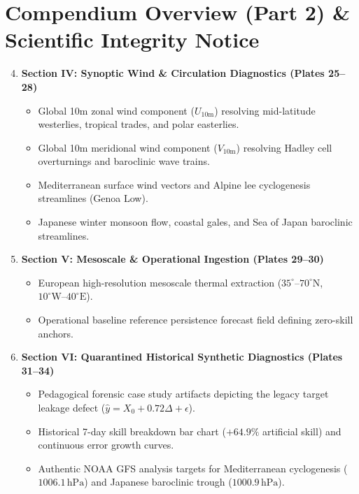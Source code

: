 \documentclass[11pt,a4paper]{article}
\begin{document}
\section*{\Large\color{navyblue} Compendium Overview (Part 2) \& Scientific Integrity Notice}
\vspace{0.15cm}
\begin{tcolorbox}[colback=panelbg,colframe=panelborder,arc=2mm,title={\bfseries Thematic Visual Architecture (Part 2: Circulation, Mesoscale \& Quarantined Diagnostics)},coltitle=navyblue]
\begin{enumerate}[leftmargin=*,noitemsep]
    \setcounter{enumi}{3}
    \item \textbf{Section IV: Synoptic Wind \& Circulation Diagnostics (Plates 25--28)}
    \begin{itemize}[noitemsep]
        \item Global 10m zonal wind component ($U_{10\text{m}}$) resolving mid-latitude westerlies, tropical trades, and polar easterlies.
        \item Global 10m meridional wind component ($V_{10\text{m}}$) resolving Hadley cell overturnings and baroclinic wave trains.
        \item Mediterranean surface wind vectors and Alpine lee cyclogenesis streamlines (Genoa Low).
        \item Japanese winter monsoon flow, coastal gales, and Sea of Japan baroclinic streamlines.
    \end{itemize}
    \vspace{0.1cm}
    \item \textbf{Section V: Mesoscale \& Operational Ingestion (Plates 29--30)}
    \begin{itemize}[noitemsep]
        \item European high-resolution mesoscale thermal extraction ($35^\circ\text{--}70^\circ\text{N}$, $10^\circ\text{W}\text{--}40^\circ\text{E}$).
        \item Operational baseline reference persistence forecast field defining zero-skill anchors.
    \end{itemize}
    \vspace{0.1cm}
    \item \textbf{Section VI: Quarantined Historical Synthetic Diagnostics (Plates 31--34)}
    \begin{itemize}[noitemsep]
        \item Pedagogical forensic case study artifacts depicting the legacy target leakage defect ($\hat{y} = X_0 + 0.72\Delta + \epsilon$).
        \item Historical 7-day skill breakdown bar chart ($+64.9\%$ artificial skill) and continuous error growth curves.
        \item Authentic NOAA GFS analysis targets for Mediterranean cyclogenesis ($1006.1\,\text{hPa}$) and Japanese baroclinic trough ($1000.9\,\text{hPa}$).
    \end{itemize}
\end{enumerate}
\end{tcolorbox}
\end{document}
